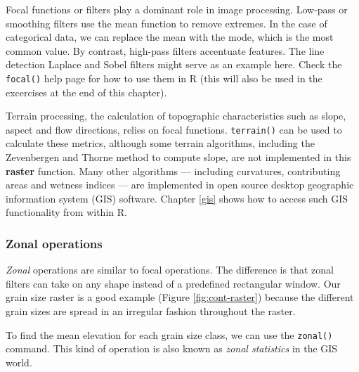 \documentclass[]{krantz}
\newenvironment{Shaded}{\begin{snugshade}}{\end{snugshade}}
\newcommand{\CommentTok}[1]{\textcolor[rgb]{0.37,0.37,0.37}{\textit{#1}}}
\newcommand{\DataTypeTok}[1]{\textcolor[rgb]{0.27,0.27,0.27}{#1}}
\newcommand{\KeywordTok}[1]{\textcolor[rgb]{0.27,0.27,0.27}{\textbf{#1}}}
\newcommand{\NormalTok}[1]{#1}
\newcommand{\OperatorTok}[1]{\textcolor[rgb]{0.43,0.43,0.43}{\textbf{#1}}}
\newcommand{\StringTok}[1]{\textcolor[rgb]{0.5,0.5,0.5}{#1}}
\begin{document}
Focal functions or filters play a dominant role in image processing.
Low-pass or smoothing filters use the mean function to remove extremes.
In the case of categorical data, we can replace the mean with the mode, which is the most common value.
By contrast, high-pass filters accentuate features.
The line detection Laplace and Sobel filters might serve as an example here.
Check the \texttt{focal()} help page for how to use them in R (this will also be used in the excercises at the end of this chapter).

Terrain processing, the calculation of topographic characteristics such as slope, aspect and flow directions, relies on focal functions.
\texttt{terrain()} can be used to calculate these metrics, although some terrain algorithms, including the Zevenbergen and Thorne method to compute slope, are not implemented in this \textbf{raster} function.
Many other algorithms --- including curvatures, contributing areas and wetness indices --- are implemented in open source desktop geographic information system (GIS) software.
Chapter \ref{gis} shows how to access such GIS functionality from within R.

\hypertarget{zonal-operations}{%
\subsubsection{Zonal operations}\label{zonal-operations}}

\emph{Zonal} operations are similar to focal operations.
The difference is that zonal filters can take on any shape instead of a predefined rectangular window.
Our grain size raster is a good example (Figure \ref{fig:cont-raster}) because the different grain sizes are spread in an irregular fashion throughout the raster.

To find the mean elevation for each grain size class, we can use the \texttt{zonal()} command.
This kind of operation is also known as \emph{zonal statistics} in the GIS world.

\begin{Shaded}
\end{Shaded}
\end{document}
